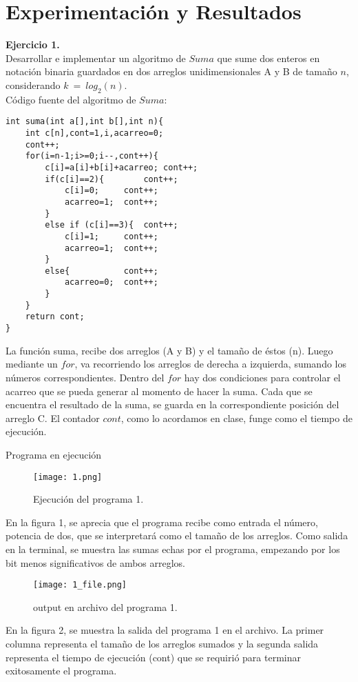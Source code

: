 \documentclass[12pt]{report}
\begin{document}
	\section{Experimentación y Resultados}	
	\textbf{Ejercicio 1.}\\
	Desarrollar e implementar un algoritmo de $Suma$ que sume dos enteros en notación binaria guardados en dos arreglos unidimensionales A y B de tamaño $n$, considerando $k \ = \ log_{2}(n)$.\newline \\
	Código fuente del algoritmo de $Suma$:
	\lstset{language=C, breaklines=true, basicstyle=\footnotesize}
	\lstset{numbers=left, numberstyle=\tiny, stepnumber=1, numbersep=10pt}
	\begin{lstlisting}
int suma(int a[],int b[],int n){
	int c[n],cont=1,i,acarreo=0;	
	cont++;
	for(i=n-1;i>=0;i--,cont++){
		c[i]=a[i]+b[i]+acarreo;	cont++;
		if(c[i]==2){ 		cont++;
			c[i]=0;		cont++;
			acarreo=1;	cont++;
		}
		else if (c[i]==3){	cont++;
			c[i]=1;		cont++;
			acarreo=1;	cont++;
		}
		else{			cont++;
			acarreo=0;	cont++;
		}
	}
	return cont;
}
	\end{lstlisting}
	
	La función suma, recibe dos arreglos (A y B) y el tamaño de éstos (n). Luego mediante un $for$, va recorriendo los arreglos de derecha a izquierda, sumando los números correspondientes. Dentro del $for$ hay dos condiciones para controlar el acarreo que se pueda generar al momento de hacer la suma. Cada que se encuentra el resultado de la suma, se guarda en la correspondiente posición del arreglo C. El contador $cont$, como lo acordamos en clase, funge como el tiempo de ejecución.\newpage
	
	
	Programa en ejecución\\
	\begin{figure}[H]
		\texttt{[image: 1.png]}
		\centering
		\caption{Ejecución del programa 1.}
		\centering
	\end{figure}
	En la figura 1, se aprecia que el programa recibe como entrada el número, potencia de dos, que se interpretará como el tamaño de los arreglos. Como salida en la terminal, se muestra las sumas echas por el programa, empezando por los bit menos significativos de ambos arreglos.
	\begin{figure}[H]
		\texttt{[image: 1\_file.png]}
		\centering
		\caption{output en archivo del programa 1.}
		\centering
	\end{figure}
	En la figura 2, se muestra la salida del programa 1 en el archivo. La primer columna representa el tamaño de los arreglos sumados y la segunda salida representa el tiempo de ejecución (cont) que se requirió para terminar exitosamente el programa.\newpage
	
\end{document}
